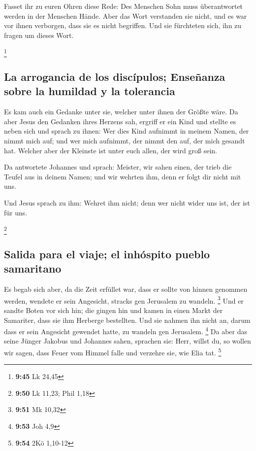 Fasset ihr zu euren Ohren diese Rede: Des Menschen Sohn
muss überantwortet werden in der Menschen Hände.  Aber
das Wort verstanden sie nicht, und es war vor ihnen verborgen, dass sie
es nicht begriffen. Und sie fürchteten sich, ihn zu fragen um dieses
Wort.

\footnote{\textbf{9:45} Lk 24,45}

\hypertarget{la-arrogancia-de-los-discuxedpulos-enseuxf1anza-sobre-la-humildad-y-la-tolerancia}{%
\subsection{La arrogancia de los discípulos; Enseñanza sobre la humildad
y la
tolerancia}\label{la-arrogancia-de-los-discuxedpulos-enseuxf1anza-sobre-la-humildad-y-la-tolerancia}}

 Es kam auch ein Gedanke unter sie, welcher unter ihnen
der Größte wäre.  Da aber Jesus den Gedanken ihres
Herzens sah, ergriff er ein Kind und stellte es neben sich
 und sprach zu ihnen: Wer dies Kind aufnimmt in meinem
Namen, der nimmt mich auf; und wer mich aufnimmt, der nimmt den auf, der
mich gesandt hat. Welcher aber der Kleinste ist unter euch allen, der
wird groß sein.

 Da antwortete Johannes und sprach: Meister, wir sahen
einen, der trieb die Teufel aus in deinem Namen; und wir wehrten ihm,
denn er folgt dir nicht mit uns.

 Und Jesus sprach zu ihm: Wehret ihm nicht; denn wer
nicht wider uns ist, der ist für uns.

\footnote{\textbf{9:50} Lk 11,23; Phil 1,18}

\hypertarget{salida-para-el-viaje-el-inhuxf3spito-pueblo-samaritano}{%
\subsection{Salida para el viaje; el inhóspito pueblo
samaritano}\label{salida-para-el-viaje-el-inhuxf3spito-pueblo-samaritano}}

 Es begab sich aber, da die Zeit erfüllet war, dass er
sollte von hinnen genommen werden, wendete er sein Angesicht, stracks
gen Jerusalem zu wandeln. \footnote{\textbf{9:51} Mk 10,32}
 Und er sandte Boten vor sich hin; die gingen hin und
kamen in einen Markt der Samariter, dass sie ihm Herberge bestellten.
 Und sie nahmen ihn nicht an, darum dass er sein
Angesicht gewendet hatte, zu wandeln gen Jerusalem. \footnote{\textbf{9:53}
  Joh 4,9}  Da aber das seine Jünger Jakobus und Johannes
sahen, sprachen sie: Herr, willst du, so wollen wir sagen, dass Feuer
vom Himmel falle und verzehre sie, wie Elia tat. \footnote{\textbf{9:54}
  2Kö 1,10-12}


